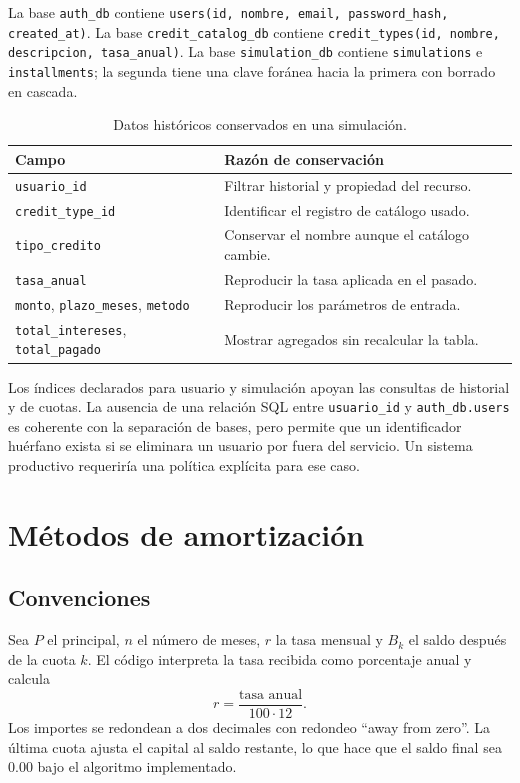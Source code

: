 \documentclass[12pt,a4paper]{article}
\begin{document}
La base \texttt{auth\_db} contiene \texttt{users(id, nombre, email,
password\_hash, created\_at)}. La base \texttt{credit\_catalog\_db} contiene
\texttt{credit\_types(id, nombre, descripcion, tasa\_anual)}. La base
\texttt{simulation\_db} contiene \texttt{simulations} e
\texttt{installments}; la segunda tiene una clave foránea hacia la primera
con borrado en cascada.

\begin{table}[H]
\centering
\caption{Datos históricos conservados en una simulación.}
\label{tab:persistencia}
\begin{tabular}{>{\raggedright\arraybackslash}p{}p{}}
\hline
\textbf{Campo} & \textbf{Razón de conservación}\\
\hline
\texttt{usuario\_id} & Filtrar historial y propiedad del recurso.\\
\texttt{credit\_type\_id} & Identificar el registro de catálogo usado.\\
\texttt{tipo\_credito} & Conservar el nombre aunque el catálogo cambie.\\
\texttt{tasa\_anual} & Reproducir la tasa aplicada en el pasado.\\
\texttt{monto}, \texttt{plazo\_meses}, \texttt{metodo} & Reproducir los parámetros de entrada.\\
\texttt{total\_intereses}, \texttt{total\_pagado} & Mostrar agregados sin recalcular la tabla.\\
\hline
\end{tabular}
\end{table}

Los índices declarados para usuario y simulación apoyan las consultas de
historial y de cuotas. La ausencia de una relación SQL entre
\texttt{usuario\_id} y \texttt{auth\_db.users} es coherente con la separación
de bases, pero permite que un identificador huérfano exista si se eliminara
un usuario por fuera del servicio. Un sistema productivo requeriría una
política explícita para ese caso.

\section{Métodos de amortización}

\subsection{Convenciones}

Sea \(P\) el principal, \(n\) el número de meses, \(r\) la tasa mensual y
\(B_k\) el saldo después de la cuota \(k\). El código interpreta la tasa
recibida como porcentaje anual y calcula
\begin{equation}
r = \frac{\text{tasa anual}}{100\cdot 12}.
\label{eq:tasa}
\end{equation}
Los importes se redondean a dos decimales con redondeo ``away from zero''. La
última cuota ajusta el capital al saldo restante, lo que hace que el saldo
final sea \(0.00\) bajo el algoritmo implementado.
\end{document}
